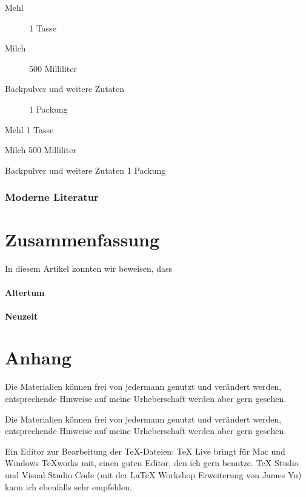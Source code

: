 \documentclass[ngerman,12pt]{scrartcl}
\begin{document}
\begin{description}
\item [Mehl] 1 Tasse
\item [Milch] 500 Milliliter
\item [Backpulver und weitere Zutaten] 1 Packung
\end{description}


\begin{compactdesc}
\item [Mehl] 1 Tasse
\item [Milch] 500 Milliliter
\item [Backpulver und weitere Zutaten] 1 Packung
\end{compactdesc}


\subsubsection{Moderne Literatur}

\blindtext[100]

\section{Zusammenfassung}

In diesem Artikel konnten wir beweisen, dass

\paragraph{Altertum} \blindtext

\paragraph{Neuzeit} \blindtext


\section{Anhang}

Die Materialien können frei von jedermann genutzt und verändert werden, entsprechende Hinweise auf meine Urheberschaft werden aber gern gesehen.

Die Materialien können frei von jedermann genutzt und verändert werden, entsprechende Hinweise auf meine Urheberschaft werden aber gern gesehen.

Ein Editor zur Bearbeitung der TeX-Dateien: TeX Live bringt für Mac und Windows TeXworks mit, einen guten Editor, den ich gern benutze. 
TeX Studio und Visual Studio Code (mit der LaTeX Workshop Erweiterung von James Yu) kann ich ebenfalls sehr empfehlen.
\end{document}

